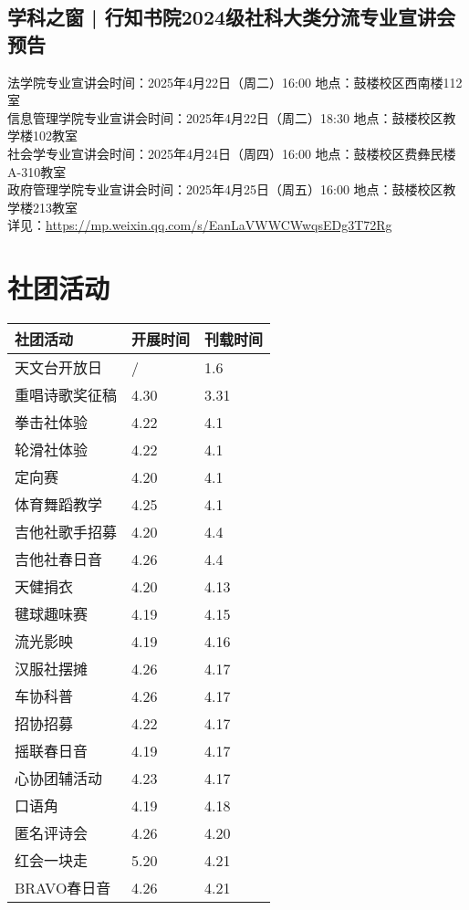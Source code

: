 \documentclass[letterpaper, 12pt]{article}
\begin{document}
\begin{multicols}{2}
\subsection{学科之窗 | 行知书院2024级社科大类分流专业宣讲会预告} %
法学院专业宣讲会时间：2025年4月22日（周二）16:00 地点：鼓楼校区西南楼112室
\\信息管理学院专业宣讲会时间：2025年4月22日（周二）18:30 地点：鼓楼校区教学楼102教室
\\社会学专业宣讲会时间：2025年4月24日（周四）16:00 地点：鼓楼校区费彝民楼A-310教室
\\政府管理学院专业宣讲会时间：2025年4月25日（周五）16:00 地点：鼓楼校区教学楼213教室
\\详见：\url{https://mp.weixin.qq.com/s/EanLaVWWCWwqsEDg3T72Rg}


\section{社团活动}
\begin{tabular}{|>{\centering\arraybackslash}m{}|m{}|m{}|}
    \hline
    社团活动 & 开展时间 & 刊载时间\\
    \hline\hline
    天文台开放日 & / & 1.6\\
    重唱诗歌奖征稿 & 4.30 & 3.31\\
    拳击社体验 & 4.22 & 4.1\\
    轮滑社体验 & 4.22 & 4.1\\
    定向赛 & 4.20 & 4.1\\
    体育舞蹈教学 & 4.25 & 4.1\\
    吉他社歌手招募 & 4.20 & 4.4\\
    吉他社春日音 & 4.26 & 4.4\\
    天健捐衣 & 4.20 & 4.13\\
    毽球趣味赛 & 4.19 & 4.15\\
    流光影映 & 4.19 & 4.16\\
    汉服社摆摊 & 4.26 & 4.17\\
    车协科普 & 4.26 & 4.17\\
    招协招募 & 4.22 & 4.17\\
    摇联春日音 & 4.19 & 4.17\\
    心协团辅活动 & 4.23 & 4.17\\
    口语角 & 4.19 & 4.18\\
    匿名评诗会 & 4.26 & 4.20\\
    红会一块走 & 5.20 & 4.21\\
    BRAVO春日音 & 4.26 & 4.21\\
    \hline
\end{tabular}

\end{multicols}
\end{document}
